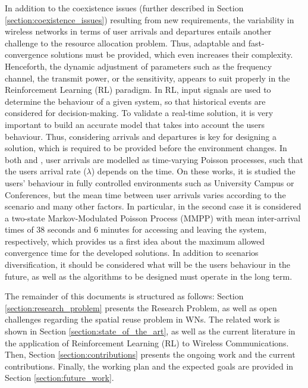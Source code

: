 \documentclass[12pt, a4paper,twoside]{tesi_upf}
\begin{document}
		In addition to the coexistence issues (further described in Section \ref{section:coexistence_issues}) resulting from new requirements, the variability in wireless networks in terms of user arrivals and departures entails another challenge to the resource allocation problem. Thus, adaptable and fast-convergence solutions must be provided, which even increases their complexity. Henceforth, the dynamic adjustment of parameters such as the frequency channel, the transmit power, or the sensitivity, appears to suit properly in the Reinforcement Learning (RL) paradigm. In RL, input signals are used to determine the behaviour of a given system, so that historical events are considered for decision-making. To validate a real-time solution, it is very important to build an accurate model that takes into account the users behaviour. Thus, considering arrivals and departures is key for designing a solution, which is required to be provided before the environment changes. In both \cite{balachandran2002characterizing} and \cite{papadopouli2005modeling}, user arrivals are modelled as time-varying Poisson processes, such that the users arrival rate ($\lambda$) depends on the time. On these works, it is studied the users' behaviour in fully controlled environments such as University Campus or Conferences, but the mean time between user arrivals varies according to the scenario and many other factors. In particular, in the second case it is considered a two-state Markov-Modulated Poisson Process (MMPP) with mean inter-arrival times of 38 seconds and 6 minutes for accessing and leaving the system, respectively, which provides us a first idea about the maximum allowed convergence time for the developed solutions. In addition to scenarios diversification, it should be considered what will be the users behaviour in the future, as well as the algorithms to be designed must operate in the long term. 
		
		The remainder of this documents is structured as follows: Section \ref{section:research_problem} presents the Research Problem, as well as open challenges regarding the spatial reuse problem in WNs. The related work is shown in Section \ref{section:state_of_the_art}, as well as the current literature in the application of Reinforcement Learning (RL) to Wireless Communications. Then, Section \ref{section:contributions} presents the ongoing work and the current contributions. Finally, the working plan and the expected goals are provided in Section \ref{section:future_work}.

\end{document}
